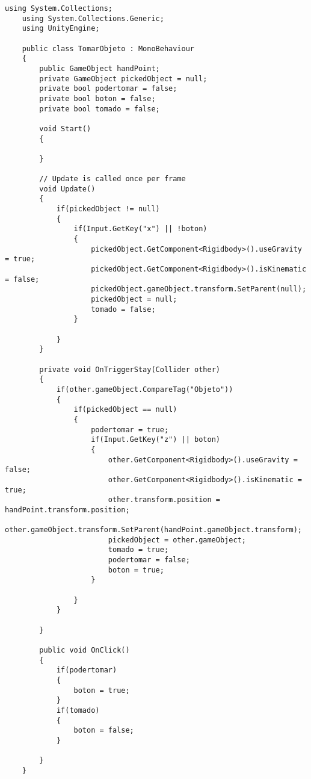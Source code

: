 \begin{lstlisting}[frame=single]
    using System.Collections;
    using System.Collections.Generic;
    using UnityEngine;

    public class TomarObjeto : MonoBehaviour
    {
        public GameObject handPoint;
        private GameObject pickedObject = null;
        private bool podertomar = false;
        private bool boton = false;
        private bool tomado = false;

        void Start()
        {
            
        }

        // Update is called once per frame
        void Update()
        {
            if(pickedObject != null)
            {
                if(Input.GetKey("x") || !boton)
                {
                    pickedObject.GetComponent<Rigidbody>().useGravity = true;
                    pickedObject.GetComponent<Rigidbody>().isKinematic = false;
                    pickedObject.gameObject.transform.SetParent(null);
                    pickedObject = null;
                    tomado = false;
                }
                
            }
        }

        private void OnTriggerStay(Collider other)
        {
            if(other.gameObject.CompareTag("Objeto"))
            {
                if(pickedObject == null)
                {
                    podertomar = true;
                    if(Input.GetKey("z") || boton)
                    {
                        other.GetComponent<Rigidbody>().useGravity = false;
                        other.GetComponent<Rigidbody>().isKinematic = true;
                        other.transform.position = handPoint.transform.position;
                        other.gameObject.transform.SetParent(handPoint.gameObject.transform);
                        pickedObject = other.gameObject;
                        tomado = true;
                        podertomar = false;
                        boton = true;
                    }
                    
                }
            }
            
        }

        public void OnClick()
        {
            if(podertomar)
            {
                boton = true;
            }
            if(tomado)
            {
                boton = false;
            }
            
        }
    }
\end{lstlisting}